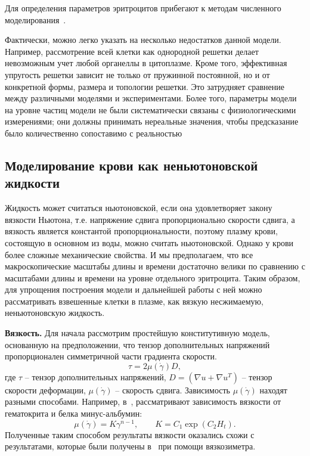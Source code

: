 Для определения параметров эритроцитов прибегают к методам численного моделирования~\cite{bessonov:2014}.

Фактически, можно легко указать на несколько недостатков данной модели. Например, рассмотрение всей клетки как однородной решетки 
делает невозможным учет любой органеллы в цитоплазме. Кроме того, эффективная упругость решетки зависит не только от 
пружинной постоянной, но и от конкретной формы, размера и топологии решетки. Это затрудняет сравнение между различными моделями 
и экспериментами. Более того, параметры модели на уровне частиц  модели не были систематически связаны с физиологическими измерениями; 
они должны принимать нереальные значения, чтобы предсказание было количественно сопоставимо с реальностью 


\subsection{Моделирование крови как неньютоновской жидкости}
Жидкость может считаться ньютоновской, если она удовлетворяет закону вязкости Ньютона, 
т.е. напряжение сдвига пропорционально скорости сдвига, а вязкость является константой пропорциональности, 
поэтому плазму крови, состоящую в основном из воды, можно считать ньютоновской. Однако у крови более сложные механические свойства. 
И мы предполагаем, что все макроскопические масштабы длины и времени достаточно велики по сравнению с масштабами длины и времени 
на уровне отдельного эритроцита. Таким образом, для упрощения построения модели и дальнейшей работы с ней можно рассматривать 
взвешенные клетки в плазме, как вязкую несжимаемую, неньютоновскую жидкость.

\textbf{Вязкость.}
Для начала рассмотрим простейшую конститутивную модель, основанную на предположении, что тензор дополнительных напряжений пропорционален
симметричной части градиента скорости.
$$
\tau=2\mu (\dot{\gamma})D,
$$
где $\tau $ -- тензор дополнительных напряжений, $D=(\nabla u+\nabla u^T)$ -- тензор скорости деформации, 
$\mu (\dot{\gamma})$ -- скорость сдвига.
Зависимость $\mu (\dot{\gamma})$ находят разными способами. Например, в~\cite{walburn:1976}, 
рассматривают зависимость вязкости от гематокрита и белка минус-альбумин: \\
$$
\mu (\dot{\gamma})=K{\gamma}^{n-1}, \qquad  K=C_1 \exp (C_2 H_t).
$$
Полученные таким способом результаты вязкости оказались схожи с результатами, которые были получены в~\cite{kim:2000} при помощи вязкозиметра.\\


